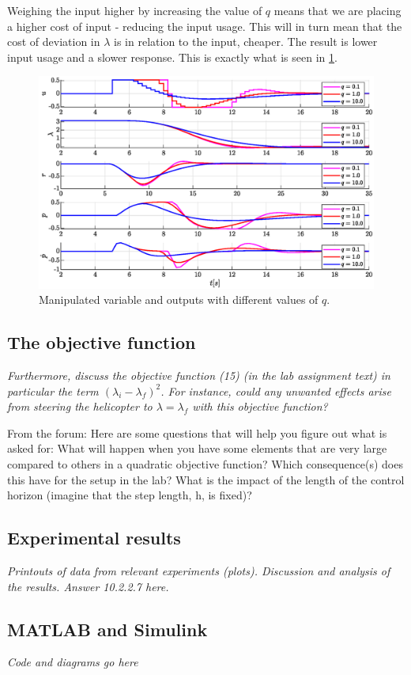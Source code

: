 \documentclass[../main.tex]{subfiles}
\begin{document}
Weighing the input higher by increasing the value of $q$ means that we are placing a higher cost of input - reducing the input usage. This will in turn mean that the cost of deviation in $\lambda$ is in relation to the input, cheaper. The result is lower input usage and a slower response. This is exactly what is seen in \cref{fig:lab2optimalu}.

\begin{figure}[h]
	\centering
	\includegraphics[width=\linewidth]{figures/lab2_optimal_u}
	\caption{Manipulated variable and outputs with different values of $q$.}
	\label{fig:lab2optimalu}
\end{figure}

\subsection{The objective function}
\textit{Furthermore, discuss the objective function (15) (in the lab assignment text) in particular the term $(\lambda_i-\lambda_f )^2$. For instance, could any unwanted effects arise from steering the helicopter to $\lambda =\lambda_f$ with this objective function?}

From the forum: Here are some questions that will help you figure out what is asked for:
What will happen when you have some elements that are very large compared to others in a quadratic objective function? Which consequence(s) does this have for the setup in the lab? What is the impact of the length of the control horizon (imagine that the step length, h, is fixed)?

\subsection{Experimental results}
\textit{Printouts of data from relevant experiments (plots).
Discussion and analysis of the results.
Answer 10.2.2.7 here.}

\subsection{MATLAB and Simulink}
\textit{Code and diagrams go here}
	
\end{document}

